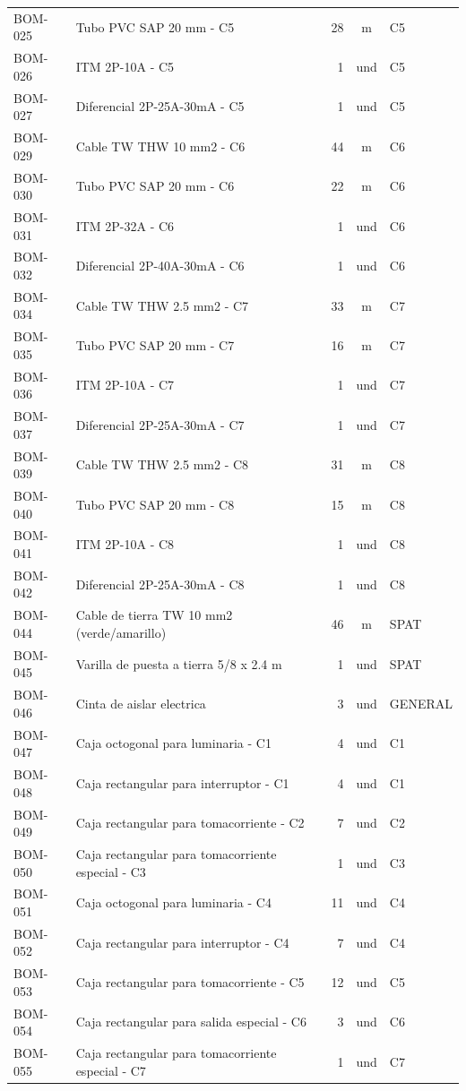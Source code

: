 \begin{longtable}{p{1.7cm}p{7.5cm}r c p{2.2cm}}
BOM-025 & Tubo PVC SAP 20 mm - C5 & 28 & m & C5 \\
BOM-026 & ITM 2P-10A - C5 & 1 & und & C5 \\
BOM-027 & Diferencial 2P-25A-30mA - C5 & 1 & und & C5 \\
BOM-029 & Cable TW THW 10 mm2 - C6 & 44 & m & C6 \\
BOM-030 & Tubo PVC SAP 20 mm - C6 & 22 & m & C6 \\
BOM-031 & ITM 2P-32A - C6 & 1 & und & C6 \\
BOM-032 & Diferencial 2P-40A-30mA - C6 & 1 & und & C6 \\
BOM-034 & Cable TW THW 2.5 mm2 - C7 & 33 & m & C7 \\
BOM-035 & Tubo PVC SAP 20 mm - C7 & 16 & m & C7 \\
BOM-036 & ITM 2P-10A - C7 & 1 & und & C7 \\
BOM-037 & Diferencial 2P-25A-30mA - C7 & 1 & und & C7 \\
BOM-039 & Cable TW THW 2.5 mm2 - C8 & 31 & m & C8 \\
BOM-040 & Tubo PVC SAP 20 mm - C8 & 15 & m & C8 \\
BOM-041 & ITM 2P-10A - C8 & 1 & und & C8 \\
BOM-042 & Diferencial 2P-25A-30mA - C8 & 1 & und & C8 \\
BOM-044 & Cable de tierra TW 10 mm2 (verde/amarillo) & 46 & m & SPAT \\
BOM-045 & Varilla de puesta a tierra 5/8 x 2.4 m & 1 & und & SPAT \\
BOM-046 & Cinta de aislar electrica & 3 & und & GENERAL \\
BOM-047 & Caja octogonal para luminaria - C1 & 4 & und & C1 \\
BOM-048 & Caja rectangular para interruptor - C1 & 4 & und & C1 \\
BOM-049 & Caja rectangular para tomacorriente - C2 & 7 & und & C2 \\
BOM-050 & Caja rectangular para tomacorriente especial - C3 & 1 & und & C3 \\
BOM-051 & Caja octogonal para luminaria - C4 & 11 & und & C4 \\
BOM-052 & Caja rectangular para interruptor - C4 & 7 & und & C4 \\
BOM-053 & Caja rectangular para tomacorriente - C5 & 12 & und & C5 \\
BOM-054 & Caja rectangular para salida especial - C6 & 3 & und & C6 \\
BOM-055 & Caja rectangular para tomacorriente especial - C7 & 1 & und & C7 \\

\end{longtable}
